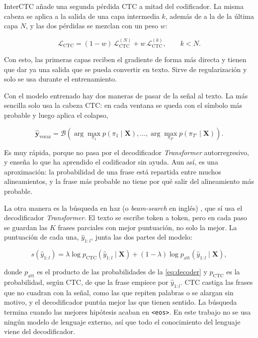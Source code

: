 InterCTC \cite{lee2021interctc} añade una segunda pérdida CTC a mitad del codificador. La misma cabeza se aplica a la salida de una capa intermedia $k$, además de a la de la última capa $N$, y las dos pérdidas se mezclan con un peso $w$:

\begin{equation}
  \mathcal{L}_{\mathrm{CTC}} = (1-w)\,\mathcal{L}_{\mathrm{CTC}}^{(N)} + w\, \mathcal{L}_{\mathrm{CTC}}^{(k)}, \qquad k < N.
  \label{eq:interctc}
\end{equation}

Con esto, las primeras capas reciben el gradiente de forma más directa y tienen que dar ya una salida que se pueda convertir en texto. Sirve de regularización y solo se usa durante el entrenamiento.

Con el modelo entrenado hay dos maneras de pasar de la señal al texto. La más sencilla solo usa la cabeza CTC: en cada ventana se queda con el símbolo más probable y luego aplica el colapso,

\begin{equation}
  \hat{\mathbf{y}}_{\mathrm{voraz}} = \mathcal{B}\left( \arg\max_{\pi_1} p(\pi_1 \mid \mathbf{X}), \dots, \arg\max_{\pi_{T'}} p(\pi_{T'} \mid \mathbf{X}) \right).
  \label{eq:ctc-greedy}
\end{equation}

Es muy rápida, porque no pasa por el decodificador \textit{Transformer} autorregresivo, y enseña lo que ha aprendido el codificador sin ayuda. Aun así, es una aproximación: la probabilidad de una frase está repartida entre muchos alineamientos, y la frase más probable no tiene por qué salir del alineamiento más probable.

La otra manera es la búsqueda en haz (o \textit{beam-search} en inglés) \cite{watanabe2017hybrid}, que sí usa el decodificador \textit{Transformer}. El texto se escribe token a token, pero en cada paso se guardan las $K$ frases parciales con mejor puntuación, no solo la mejor. La puntuación de cada una, $\hat{y}_{1:l}$, junta las dos partes del modelo:

\begin{equation}
  s(\hat{y}_{1:l}) = \lambda \log p_{\mathrm{CTC}}(\hat{y}_{1:l} \mid \mathbf{X}) + (1-\lambda) \log p_{\mathrm{att}}(\hat{y}_{1:l} \mid \mathbf{X}),
  \label{eq:beam}
\end{equation}

donde $p_{\mathrm{att}}$ es el producto de las probabilidades de la \cref{eq:decoder} y $p_{\mathrm{CTC}}$ es la probabilidad, según CTC, de que la frase empiece por $\hat{y}_{1:l}$. CTC castiga las frases que no cuadran con la señal, como las que repiten palabras o se alargan sin motivo, y el decodificador puntúa mejor las que tienen sentido. La búsqueda termina cuando las mejores hipótesis acaban en \texttt{<eos>}. En este trabajo no se usa ningún modelo de lenguaje externo, así que todo el conocimiento del lenguaje viene del decodificador.

